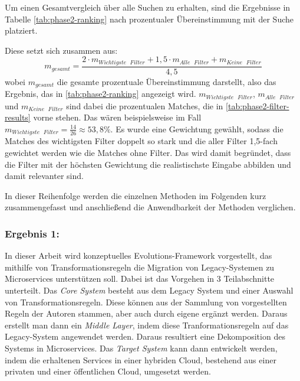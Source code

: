 

Um einen Gesamtvergleich über alle Suchen zu erhalten, sind die Ergebnisse in Tabelle \cref{tab:phase2-ranking} nach prozentualer Übereinstimmung mit der Suche platziert.


Diese setzt sich zusammen aus:
\[
m_{gesamt} = \frac{2 \cdot m_{Wichtigste \text{ } Filter} + 1,5 \cdot  m_{Alle \text{ } Filter} +  m_{Keine \text{ } Filter}}{4,5}
\]
wobei $m_{gesamt}$ die gesamte prozentuale Übereinstimmung darstellt, also das Ergebnis, das in \cref{tab:phase2-ranking} angezeigt wird.
$m_{Wichtigste \text{ } Filter}$, $m_{Alle \text{ } Filter}$ und $m_{Keine \text{ } Filter}$ sind dabei die prozentualen Matches, die in \cref{tab:phase2-filter-results} vorne stehen.
Das wären beispielsweise im Fall  $m_{Wichtigste \text{ } Filter} = \frac{14}{26} \approx 53,8\%$.
Es wurde eine Gewichtung gewählt, sodass die Matches des wichtigsten Filter doppelt so stark und die aller Filter 1,5-fach gewichtet werden wie die Matches ohne Filter.
Das wird damit begründet, dass die Filter mit der höchsten Gewichtung die realistischste Eingabe abbilden und damit relevanter sind.

In dieser Reihenfolge werden die einzelnen Methoden im Folgenden kurz zusammengefasst und anschließend die Anwendbarkeit der Methoden verglichen.

\subsubsection{Ergebnis 1:   \cite{arh-result-no-filter-1}}

In dieser Arbeit wird konzeptuelles Evolutions-Framework vorgestellt, das mithilfe von Trans\-for\-ma\-tions\-re\-geln die Migration von Legacy-Systemen zu Microservices unterstützen soll.
Dabei ist das Vorgehen
in 3 Teilabschnitte unterteilt.
Das \emph{Core System} besteht aus dem Legacy System und einer Auswahl von Transformationsregeln.
Diese können aus der Sammlung von vorgestellten Regeln der Autoren stammen, aber auch durch eigene ergänzt werden.
Daraus erstellt man dann ein \emph{Middle Layer}, indem diese Tranformationsregeln auf das Legacy-System angewendet werden.
Daraus resultiert eine Dekomposition des Systems in Microservices.
Das \emph{Target System} kann dann entwickelt werden, indem die erhaltenen Services in einer hybriden Cloud, bestehend aus einer privaten und einer öffentlichen Cloud, umgesetzt werden.


